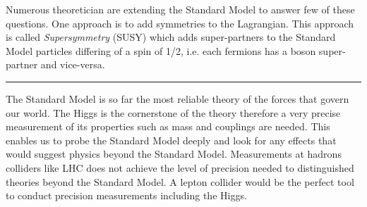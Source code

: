 Numerous theoretician are extending the Standard Model to answer few of these questions. One approach is to add symmetries to the Lagrangian. This approach is called \textit{Supersymmetry} (SUSY) which adds super-partners to the Standard Model particles differing of a spin of 1/2, i.e. each fermions has a boson super-partner and vice-versa.

\begin{center}
\rule{0.5\textwidth}{.4pt}
\end{center}

The Standard Model is so far the most reliable theory of the forces that govern our world. The Higgs is the cornerstone of the theory therefore a very precise measurement of its properties such as mass and couplings are needed. This enables us to probe the Standard Model deeply and look for any effects that would suggest physics beyond the Standard Model. Measurements at hadrons colliders like LHC does not achieve the level of precision needed to distinguished theories beyond the Standard Model. A lepton collider would be the perfect tool to conduct precision measurements including the Higgs.
